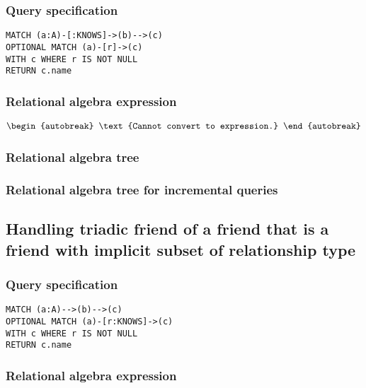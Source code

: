 \subsubsection*{Query specification}

\begin{lstlisting}
MATCH (a:A)-[:KNOWS]->(b)-->(c)
OPTIONAL MATCH (a)-[r]->(c)
WITH c WHERE r IS NOT NULL
RETURN c.name
\end{lstlisting}

\subsubsection*{Relational algebra expression}

\begin{align*}
\begin{autobreak}
\text{Cannot convert to expression.}
\end{autobreak}
\end{align*}

\subsubsection*{Relational algebra tree}


\subsubsection*{Relational algebra tree for incremental queries}


\subsection{Handling triadic friend of a friend that is a friend with implicit subset of relationship type}

\subsubsection*{Query specification}

\begin{lstlisting}
MATCH (a:A)-->(b)-->(c)
OPTIONAL MATCH (a)-[r:KNOWS]->(c)
WITH c WHERE r IS NOT NULL
RETURN c.name
\end{lstlisting}

\subsubsection*{Relational algebra expression}

